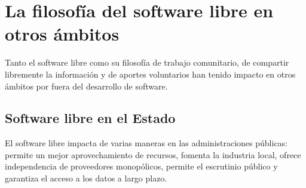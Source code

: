 \chapter{La filosofía del software libre en otros ámbitos}

Tanto el software libre como su filosofía de trabajo comunitario, de compartir libremente la información y de aportes voluntarios han tenido impacto en otros ámbitos por fuera del desarrollo de software.

\section{Software libre en el Estado}

El software libre impacta de varias maneras en las administraciones públicas: permite un mejor aprovechamiento de recursos, fomenta la industria local, ofrece independencia de proveedores monopólicos, permite el escrutinio público y garantiza el acceso a los datos a largo plazo.

